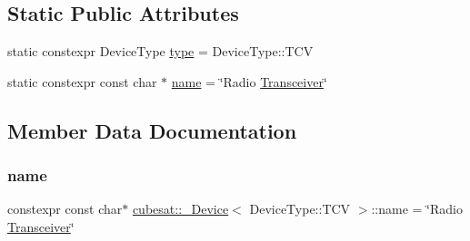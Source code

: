 \subsection*{Static Public Attributes}
\begin{DoxyCompactItemize}
\item 
static constexpr Device\+Type \hyperlink{structcubesat_1_1__Device_3_01DeviceType_1_1TCV_01_4_af8ad4cffc816e04e1d52288108350d21}{type} = Device\+Type\+::\+T\+CV
\item 
static constexpr const char $\ast$ \hyperlink{structcubesat_1_1__Device_3_01DeviceType_1_1TCV_01_4_a5316ea1f0dc718d0aad8b924510dc3f8}{name} = \char`\"{}Radio \hyperlink{namespacecubesat_a89a428f06af01db7d85fdb5c93da7599}{Transceiver}\char`\"{}
\end{DoxyCompactItemize}


\subsection{Member Data Documentation}
\mbox{\label{structcubesat_1_1__Device_3_01DeviceType_1_1TCV_01_4_a5316ea1f0dc718d0aad8b924510dc3f8}} 
\subsubsection{\texorpdfstring{name}{name}}
{\footnotesize\ttfamily constexpr const char$\ast$ \hyperlink{structcubesat_1_1__Device}{cubesat\+::\+\_\+\+Device}$<$ Device\+Type\+::\+T\+CV $>$\+::name = \char`\"{}Radio \hyperlink{namespacecubesat_a89a428f06af01db7d85fdb5c93da7599}{Transceiver}\char`\"{}\hspace{0.3cm}{\ttfamily [static]}}

\mbox{\label{structcubesat_1_1__Device_3_01DeviceType_1_1TCV_01_4_af8ad4cffc816e04e1d52288108350d21}} 
